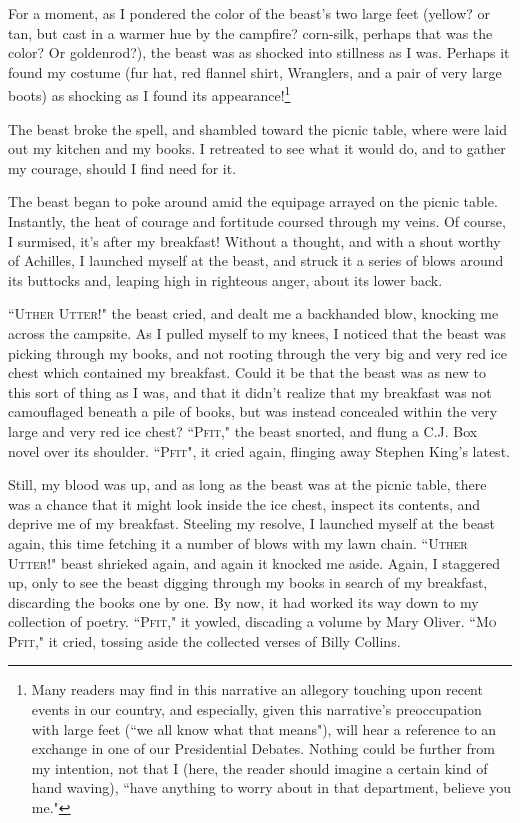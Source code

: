 \par
For a moment, as I pondered the color of the beast's two large feet (yellow?  or tan, but cast in a warmer hue by the campfire?  corn-silk, perhaps that was the color?  Or goldenrod?), the beast was as shocked into stillness as I was.  Perhaps it found my costume (fur hat, red flannel shirt, Wranglers, and a pair of very large boots) as shocking as I found its appearance!\footnote{Many readers may find in this narrative an allegory touching upon recent events in our country, and especially, given this narrative's preoccupation with large feet (``we all know what that means"), will hear a reference to an exchange in one of our Presidential Debates.  Nothing could be further from my intention, not that I (here, the reader should imagine a certain kind of hand waving), ``have anything to worry about in that department, believe you me."}
\par
The beast broke the spell, and shambled toward the picnic table, where were laid out my kitchen and my books.  I retreated to see what it would do, and to gather my courage, should I find need for it.
\par
The beast began to poke around amid the equipage arrayed on the picnic table.  Instantly, the heat of courage and fortitude coursed through my veins.  Of course, I surmised, it's after my breakfast!  Without a thought, and with a shout worthy of Achilles, I launched myself at the beast, and struck it a series of blows around its buttocks and, leaping high in righteous anger, about its lower back.
\par
``\textsc{Uther Utter!}" the beast cried, and dealt me a backhanded blow, knocking me across the campsite.  As I pulled myself to my knees, I noticed that the beast was picking through my books, and not rooting through the very big and very red ice chest which contained my breakfast.  Could it be that the beast was as new to this sort of thing as I was, and that it didn't realize that my breakfast was not camouflaged beneath a pile of books, but was instead concealed within the very large and very red ice chest?  ``\textsc{Pfit}," the beast snorted, and flung a C.J. Box novel over its shoulder.  ``\textsc{Pfit}", it cried again, flinging away Stephen King's latest.
\par
Still, my blood was up, and as long as the beast was at the picnic table, there was a chance that it might look inside the ice chest, inspect its contents, and deprive me of my breakfast.  Steeling my resolve, I launched myself at the beast again, this time fetching it a number of blows with my lawn chain.  ``\textsc{Uther Utter}!" beast shrieked again, and again it knocked me aside.  Again, I staggered up, only to see the beast digging through my books in search of my breakfast, discarding the books one by one.  By now, it had worked its way down to my collection of poetry.  ``\textsc{Pfit}," it yowled, discading a volume by Mary Oliver.  ``\textsc{Mo Pfit}," it cried, tossing aside the collected verses of Billy Collins.
